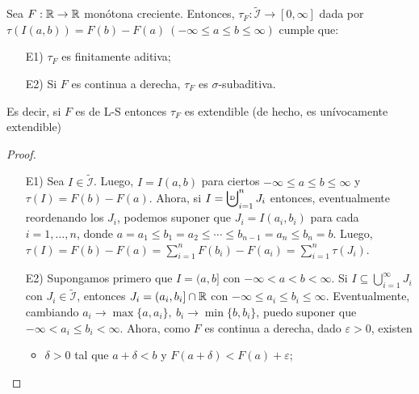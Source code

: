 \begin{theorem}
	Sea $F: \mathbb{R} \to \mathbb{R}$ monótona creciente. Entonces, $\tau_F: \widetilde{\mathcal{I}} \to [0,\infty]$ dada por $\tau(I(a,b)) = F(b) - F(a) \ (-\infty\leq a \leq b \leq \infty)$ cumple que:
	\begin{enumerate}
		\item[E1)] $\tau_F$ es finitamente aditiva;

		\item[E2)] Si $F$ es continua a derecha, $\tau_F$ es $\sigma$-subaditiva.
	\end{enumerate}
	Es decir, si $F$ es de L-S entonces $\tau_F$ es extendible (de hecho, es unívocamente extendible)
\end{theorem}
\begin{proof}~
	\begin{enumerate}
		\item[E1)] Sea $I \in \widetilde{\mathcal{I}}$. Luego, $I = I(a,b)$ para ciertos $-\infty\leq a \leq b \leq \infty$ y $\tau(I) = F(b) - F(a)$. Ahora, si $I = \bigcupd_{i=1}^{n} J_i$ entonces, eventualmente reordenando los $J_i$, podemos suponer que $J_i = I(a_i,b_i)$ para cada $i = 1,\dots,n$, donde $a = a_1 \leq b_1 = a_2 \leq \cdots \leq b_{n-1} = a_n \leq b_n = b$. Luego, $\tau(I) = F(b) - F(a) = \sum_{i=1}^{n} F(b_i) - F(a_i) = \sum_{i=1}^{n} \tau(J_i)$.

		\item[E2)] Supongamos primero que $I = (a,b]$ con $-\infty < a < b < \infty$. Si $I \subseteq \bigcup_{i=1}^{\infty} J_i$ con $J_i \in \widetilde{\mathcal{I}}$, entonces $J_i = (a_i,b_i] \cap \mathbb{R}$ con $-\infty\leq a_i \leq b_i \leq \infty$. Eventualmente, cambiando $a_i \longrightarrow \max \{a,a_i\},\ b_i \longrightarrow \min \{b,b_i\}$, puedo suponer que $-\infty < a_i \leq b_i < \infty$. Ahora, como $F$ es continua a derecha, dado $\varepsilon > 0$, existen
		\begin{itemize}
			\item $\delta > 0$ tal que $a + \delta < b$ y $F(a + \delta) < F(a) + \varepsilon$;


\end{itemize}
\end{enumerate}
\end{proof}
